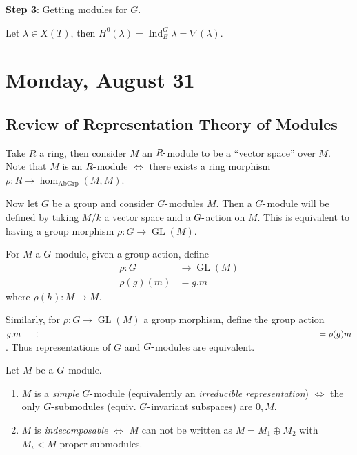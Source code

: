 \textbf{Step 3}: Getting modules for \(G\).

Let \(\lambda \in X(T)\), then
\(H^0(\lambda) = \operatorname{Ind}_B^G \lambda = \nabla(\lambda)\).

\hypertarget{monday-august-31}{%
\section{Monday, August 31}\label{monday-august-31}}

\hypertarget{review-of-representation-theory-of-modules}{%
\subsection{Review of Representation Theory of
Modules}\label{review-of-representation-theory-of-modules}}

Take \(R\) a ring, then consider \(M\) an \(R{\hbox{-}}\)module to be a
``vector space'' over \(M\). Note that \(M\) is an \(R{\hbox{-}}\)module
\(\iff\) there exists a ring morphism
\(\rho: R\to \hom_{\text{AbGrp}}(M, M)\).

Now let \(G\) be a group and consider \(G{\hbox{-}}\)modules \(M\). Then
a \(G{\hbox{-}}\)module will be defined by taking \(M/k\) a vector space
and a \(G{\hbox{-}}\)action on \(M\). This is equivalent to having a
group morphism \(\rho: G\to \operatorname{GL}(M)\).

For \(M\) a \(G{\hbox{-}}\)module, given a group action, define
\begin{align*}   \rho: G&\to \operatorname{GL}(M) \\ \rho(g)(m) &= g.m \end{align*}
where \(\rho(h): M\to M\).

Similarly, for \(\rho: G\to \operatorname{GL}(M)\) a group morphism,
define the group action \(g.m \mathrel{\vcenter{:}}=\rho(g)m\). Thus
representations of \(G\) and \(G{\hbox{-}}\)modules are equivalent.

\begin{definition}[?]

\begin{definition}[?]

Let \(M\) be a \(G{\hbox{-}}\)module.

\begin{enumerate}
\def\labelenumi{\arabic{enumi}.}
\item
  \(M\) is a \emph{simple} \(G{\hbox{-}}\)module (equivalently an
  \emph{irreducible representation}) \(\iff\) the only
  \(G{\hbox{-}}\)submodules (equiv. \(G{\hbox{-}}\)invariant subspaces)
  are \(0, M\).
\item
  \(M\) is \emph{indecomposable} \(\iff\) \(M\) can not be written as
  \(M = M_1 \oplus M_2\) with \(M_i < M\) proper submodules.
\end{enumerate}

\end{definition}

\end{definition}

